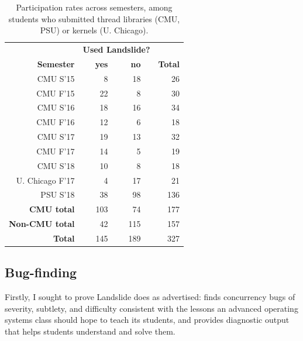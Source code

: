 \begin{table}[h]
	\begin{center}
		\begin{tabular}{r|crcrc|r}
			& \multicolumn{5}{c|}{\bf Used Landslide?} & \\
			\bf Semester & & \bf yes & & \bf no & & \bf Total \\
			\hline
			CMU S'15	& &   8	& &  18	& &  26 \\
			CMU F'15	& &  22	& &   8	& &  30 \\
			CMU S'16	& &  18	& &  16	& &  34 \\
			CMU F'16	& &  12	& &   6	& &  18 \\
			CMU S'17	& &  19	& &  13	& &  32 \\
			CMU F'17	& &  14	& &   5	& &  19 \\
			CMU S'18	& &  10	& &   8	& &  18 \\
			\hline
			U. Chicago F'17	& &   4	& &  17	& &  21 \\ %
			PSU S'18	& &  38	& &  98	& & 136 \\
			\hline
			\bf CMU total	& & 103	& &  74	& & 177 \\
			\bf Non-CMU total
					& &  42	& & 115	& & 157 \\
			\bf Total	& & 145	& & 189	& & 327 \\
		\end{tabular}
	\end{center}
	\caption{Participation rates across semesters,
	among students who submitted thread libraries (CMU, PSU) or kernels (U. Chicago).}
	\label{tab:photo-of-ze-studence}
\end{table}

\subsection{Bug-finding}
\label{sec:education-eval-bugfinding}

Firstly, I sought to prove Landslide does as advertised:
finds concurrency bugs of severity, subtlety, and difficulty
consistent with the lessons an advanced operating systems class should hope to teach its students,
and provides diagnostic output that helps students understand and solve them.

